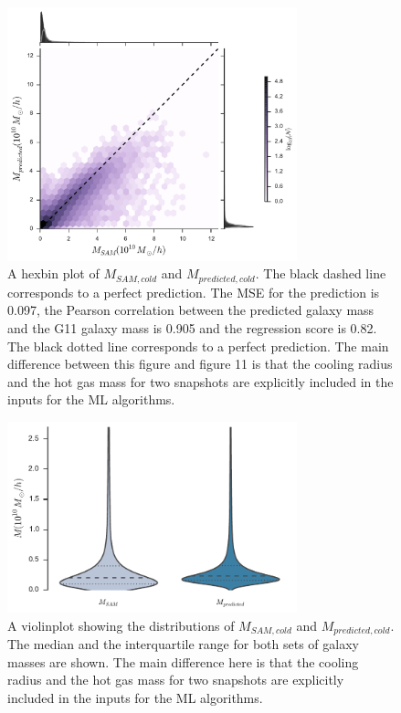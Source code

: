 \documentclass[a4paper,fleqn,usenatbib]{mnras}
\begin{document}
\begin{figure}
  \includegraphics[width=84mm]{fig16.pdf}
  \caption{ A hexbin plot of $M_{SAM,cold}$ and $M_{predicted,cold}$. The black dashed line corresponds to a perfect prediction. The MSE for the prediction is 0.097, the Pearson correlation between the predicted galaxy mass and the G11 galaxy mass is 0.905 and the regression score is 0.82. The black dotted line corresponds to a perfect prediction. The main difference between this figure and figure 11 is that the cooling radius and the hot gas mass for two snapshots are explicitly included in the inputs for the ML algorithms.}
  \label{cold_b1}

\end{figure}


\begin{figure}
  \includegraphics[width=84mm]{fig17.pdf}
  \caption{A violinplot showing the distributions of  $M_{SAM,cold}$ and $M_{predicted,cold}$. The median and the interquartile range for both sets of galaxy masses are shown. The main difference here is that the cooling radius and the hot gas mass for two snapshots are explicitly included in the inputs for the ML algorithms.}
    \label{cold_b2}

\end{figure}
\end{document}
